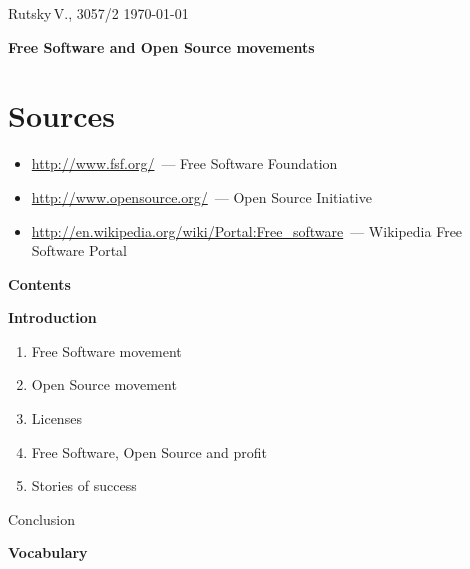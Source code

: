 \documentclass[10pt,a4paper]{article}
\newcommand{\bit}{\begin{itemize}}
\newcommand{\eit}{\end{itemize}}
\begin{document}

\pagestyle{empty}

\begin{flushright}
  Rutsky\,V., 3057/2 \qquad \today
\end{flushright}

\begin{center}
{\LARGE \bfseries Free Software and Open Source movements}
\end{center}

\section*{Sources}
  \bit
    \item \url{http://www.fsf.org/}~--- Free Software Foundation
    \item \url{http://www.opensource.org/}~--- Open Source Initiative
    \item \url{http://en.wikipedia.org/wiki/Portal:Free_software}~--- Wikipedia Free Software Portal
  \eit

\begin{center}
{\Large \bfseries Contents}
\end{center}

\begin{center}
\begin{minipage}[center]{10cm}
{\bfseries 
Introduction
\begin{enumerate}

  \item {Free Software movement}
  \item {Open Source movement}
  \item {Licenses}
  \item {Free Software, Open Source and profit}
  \item {Stories of success}
\end{enumerate}
Conclusion
}

\end{minipage}
\end{center}

\begin{center}
{\Large \bfseries Vocabulary}
\end{center}
\end{document}
